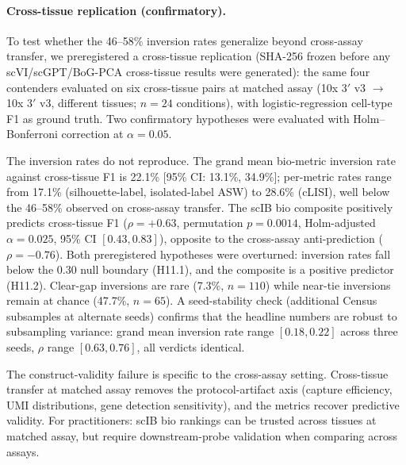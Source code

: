 \documentclass[10pt,letterpaper]{article}
\begin{document}
\paragraph{Cross-tissue replication (confirmatory).} To test whether the 46--58\% inversion rates generalize beyond cross-assay transfer, we preregistered a cross-tissue replication (SHA-256 frozen before any scVI/scGPT/BoG-PCA cross-tissue results were generated): the same four contenders evaluated on six cross-tissue pairs at matched assay (10x 3$'$ v3 $\rightarrow$ 10x 3$'$ v3, different tissues; $n = 24$ conditions), with logistic-regression cell-type F1 as ground truth. Two confirmatory hypotheses were evaluated with Holm--Bonferroni correction at $\alpha = 0.05$.

The inversion rates do not reproduce. The grand mean bio-metric inversion rate against cross-tissue F1 is 22.1\% [95\% CI: 13.1\%, 34.9\%]; per-metric rates range from 17.1\% (silhouette-label, isolated-label ASW) to 28.6\% (cLISI), well below the 46--58\% observed on cross-assay transfer. The scIB bio composite positively predicts cross-tissue F1 ($\rho = +0.63$, permutation $p = 0.0014$, Holm-adjusted $\alpha = 0.025$, 95\% CI $[0.43, 0.83]$), opposite to the cross-assay anti-prediction ($\rho = -0.76$). Both preregistered hypotheses were overturned: inversion rates fall below the 0.30 null boundary (H11.1), and the composite is a positive predictor (H11.2). Clear-gap inversions are rare (7.3\%, $n = 110$) while near-tie inversions remain at chance (47.7\%, $n = 65$). A seed-stability check (additional Census subsamples at alternate seeds) confirms that the headline numbers are robust to subsampling variance: grand mean inversion rate range $[0.18, 0.22]$ across three seeds, $\rho$ range $[0.63, 0.76]$, all verdicts identical.

The construct-validity failure is specific to the cross-assay setting. Cross-tissue transfer at matched assay removes the protocol-artifact axis (capture efficiency, UMI distributions, gene detection sensitivity), and the metrics recover predictive validity. For practitioners: scIB bio rankings can be trusted across tissues at matched assay, but require downstream-probe validation when comparing across assays.
\end{document}
